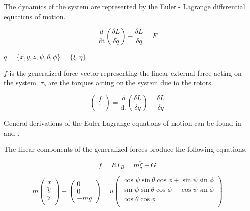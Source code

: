 \noindent The dynamics of the system are represented by the Euler - Lagrange differential equations of motion.

\begin{equation}
    \frac{d}{\text{dt}} \left( \frac{\delta  L} {\delta \dot{q}}\right) - \frac{\delta  L}{\delta q}=F 
\end{equation}


$ q = \{x,y,z,\psi ,\theta ,\phi \} = \{ \xi , \eta \}  $.


\noindent  $ f $ is the generalized force vector representing the linear external force acting on the system. 
$\tau_b $ are the torques acting on the system due to the rotors.

\begin{equation}
    \left( \begin{array}{c} f \\ \tau \\ \end{array} \right) = \frac{d}{\text{dt}} \left( \frac{\delta  L} {\delta \dot{q}}\right) - \frac{\delta  L}{\delta q}
\end{equation}

General derivations of the Euler-Lagrange equations of motion can be found in \cite{marion1995classical} and  \cite{cornelius1970variational}. 





\noindent The linear components of the generalized forces produce the following equations.

\begin{equation}
    f =  R  T_B = m \ddot{ \xi} -  G
\end{equation}


\begin{equation}
    m\left(\begin{array}{c}
      \ddot{x}\\
      \ddot{y}\\
      \ddot{z}\\
    \end{array}\right)
    - \left( \begin{array}{c}
        0\\
        0\\
        -m g  
      \end{array} \right)
      =u
     \left(
    \begin{array}{c}
     \cos{\psi}\sin{\theta}\cos{\phi} + \sin{\psi}\sin{\phi} \\
     \sin{\psi}\sin{\theta}\cos{\phi} - \cos{\psi}\sin{\phi} \\
     \cos{\theta} \cos{\phi} \\
    \end{array}
    \right)
\end{equation}


